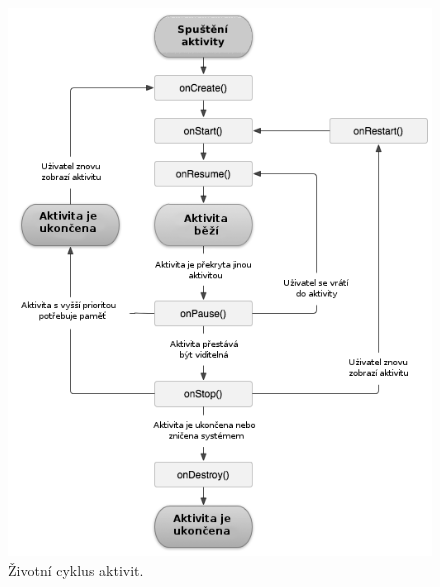 \documentclass[12pt]{article}
\begin{document}
\begin{figure}[ht]
\centerline{\includegraphics[scale=0.68]{images/lifecycleBW.png}}
\caption{Životní cyklus aktivit.} \label{lifecycle}
\end{figure}
\end{document}
